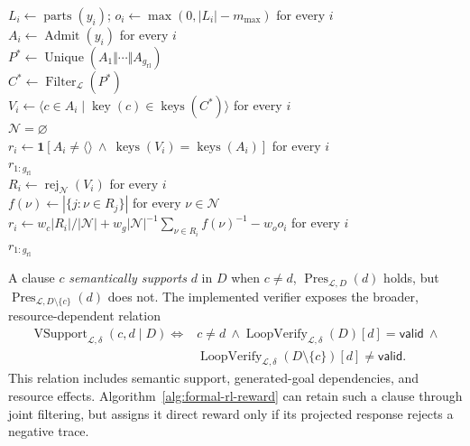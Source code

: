 \begin{algorithm}[H]
\caption{CRAFT reward for one RL group}
\label{alg:formal-rl-reward}
\begin{algorithmic}
\algline \(L_i\leftarrow\operatorname{parts}(y_i)\);
  \quad \(o_i\leftarrow\max(0,|L_i|-m_{\max})\) for every \(i\)\\
\algline \(A_i\leftarrow\operatorname{Admit}(y_i)\) for every \(i\)\\
\algline \(P^*\leftarrow\operatorname{Unique}(A_1\Vert\cdots\Vert
  A_{g_{\mathrm{rl}}})\)\\
\algline \(C^*\leftarrow\operatorname{Filter}_{\mathcal L}(P^*)\)
  \\
\algline \(V_i\leftarrow\langle c\in A_i\mid\operatorname{key}(c)\in
  \operatorname{keys}(C^*)\rangle\) for every \(i\)\\
\algline {} \(\mathcal N=\varnothing\) \\
\algline \algind \(r_i\leftarrow\mathbf 1[A_i\ne\langle\rangle\ \land\
  \operatorname{keys}(V_i)=\operatorname{keys}(A_i)]\) for every \(i\)\\
\algline \algind \kw{return} \(r_{1:g_{\mathrm{rl}}}\)\\
\algline \(R_i\leftarrow\operatorname{rej}_{\mathcal N}(V_i)\) for every \(i\)\\
\algline \(f(\nu)\leftarrow|\{j:\nu\in R_j\}|\) for every \(\nu\in\mathcal N\)\\
\algline \(r_i\leftarrow w_c|R_i|/|\mathcal N|+
  w_g|\mathcal N|^{-1}\sum_{\nu\in R_i}f(\nu)^{-1}-w_o o_i\)
  for every \(i\)\\
\algline {} \(r_{1:g_{\mathrm{rl}}}\)\\
\end{algorithmic}
\end{algorithm}

A clause \(c\) \emph{semantically supports} \(d\) in \(D\) when
\(c\ne d\), \(\operatorname{Pres}_{\mathcal L,D}(d)\) holds, but
\(\operatorname{Pres}_{\mathcal L,D\setminus\{c\}}(d)\) does not.  The
implemented verifier exposes the broader, resource-dependent relation
\begin{equation}
\begin{split}
\operatorname{VSupport}_{\mathcal L,\delta}(c,d\mid D)
\iff{}&c\ne d\ \land
\operatorname{LoopVerify}_{\mathcal L,\delta}(D)[d]=\mathsf{valid}\ \land\\
&\operatorname{LoopVerify}_{\mathcal L,\delta}(D\setminus\{c\})[d]
  \ne\mathsf{valid}.
\end{split}
\label{eq:formal-verifier-support}
\end{equation}
This relation includes semantic support, generated-goal dependencies, and
resource effects.  Algorithm~\ref{alg:formal-rl-reward} can retain such a
clause through joint filtering, but assigns it direct reward only if its
projected response rejects a negative trace.

